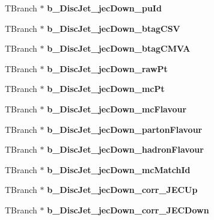 \begin{DoxyCompactItemize}
T\+Branch $\ast$ {\bfseries b\+\_\+\+Disc\+Jet\+\_\+jec\+Down\+\_\+pu\+Id}
\item 
\hypertarget{classMiniTree_aa5053cf8f510125d68948ccd96298e40}{}\label{classMiniTree_aa5053cf8f510125d68948ccd96298e40} 
T\+Branch $\ast$ {\bfseries b\+\_\+\+Disc\+Jet\+\_\+jec\+Down\+\_\+btag\+C\+SV}
\item 
\hypertarget{classMiniTree_a0a0ac91fae07b71c4e31b3a05f7692d7}{}\label{classMiniTree_a0a0ac91fae07b71c4e31b3a05f7692d7} 
T\+Branch $\ast$ {\bfseries b\+\_\+\+Disc\+Jet\+\_\+jec\+Down\+\_\+btag\+C\+M\+VA}
\item 
\hypertarget{classMiniTree_ad617f0875d57e855af10c072e382d977}{}\label{classMiniTree_ad617f0875d57e855af10c072e382d977} 
T\+Branch $\ast$ {\bfseries b\+\_\+\+Disc\+Jet\+\_\+jec\+Down\+\_\+raw\+Pt}
\item 
\hypertarget{classMiniTree_af3a797aa21e8ca08611fd18157a6cf9e}{}\label{classMiniTree_af3a797aa21e8ca08611fd18157a6cf9e} 
T\+Branch $\ast$ {\bfseries b\+\_\+\+Disc\+Jet\+\_\+jec\+Down\+\_\+mc\+Pt}
\item 
\hypertarget{classMiniTree_a0f7a487f227c0b10ee382f2273c18092}{}\label{classMiniTree_a0f7a487f227c0b10ee382f2273c18092} 
T\+Branch $\ast$ {\bfseries b\+\_\+\+Disc\+Jet\+\_\+jec\+Down\+\_\+mc\+Flavour}
\item 
\hypertarget{classMiniTree_a1542c6a2fba41127be35a143292b4040}{}\label{classMiniTree_a1542c6a2fba41127be35a143292b4040} 
T\+Branch $\ast$ {\bfseries b\+\_\+\+Disc\+Jet\+\_\+jec\+Down\+\_\+parton\+Flavour}
\item 
\hypertarget{classMiniTree_a5b3db44f7f4c8d2a293bb747735217ad}{}\label{classMiniTree_a5b3db44f7f4c8d2a293bb747735217ad} 
T\+Branch $\ast$ {\bfseries b\+\_\+\+Disc\+Jet\+\_\+jec\+Down\+\_\+hadron\+Flavour}
\item 
\hypertarget{classMiniTree_a0013d79eaec03417f68ef6c9e7baf01c}{}\label{classMiniTree_a0013d79eaec03417f68ef6c9e7baf01c} 
T\+Branch $\ast$ {\bfseries b\+\_\+\+Disc\+Jet\+\_\+jec\+Down\+\_\+mc\+Match\+Id}
\item 
\hypertarget{classMiniTree_ad35e8d36f3f8e26e8436ecfca83ad646}{}\label{classMiniTree_ad35e8d36f3f8e26e8436ecfca83ad646} 
T\+Branch $\ast$ {\bfseries b\+\_\+\+Disc\+Jet\+\_\+jec\+Down\+\_\+corr\+\_\+\+J\+E\+C\+Up}
\item 
\hypertarget{classMiniTree_af5032e1710060619b07c84753fb174a4}{}\label{classMiniTree_af5032e1710060619b07c84753fb174a4} 
T\+Branch $\ast$ {\bfseries b\+\_\+\+Disc\+Jet\+\_\+jec\+Down\+\_\+corr\+\_\+\+J\+E\+C\+Down}
\item 

\end{DoxyCompactItemize}
